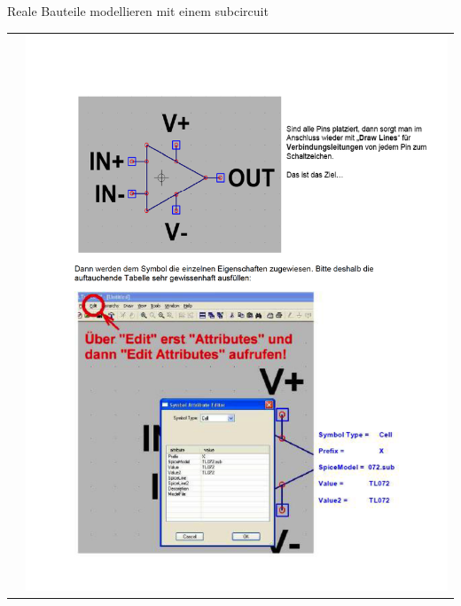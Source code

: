 \begin{frame}[t]{Reale Bauteile modellieren mit einem subcircuit}
\begin{spacing}{0.9}
\begin{tiny}
\begin{table}[h!]
\begin{tabular}{p{5cm} p{5cm}}
                     &
                    \begin{minipage}{0.5\textwidth}
                        \includegraphics[width=\linewidth]{pictures/legacy/tl072_4.png}
                    \end{minipage}
                \end{tabular}
            \end{table}
        \end{tiny} \end{spacing}
\end{frame}

